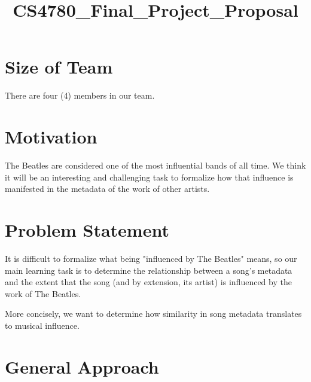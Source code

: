 \documentclass{article}
\title{CS4780_Final_Project_Proposal}
\begin{document}
 


\section{Size of Team}
There are four (4) members in our team. 

\section{Motivation}
The Beatles are considered one of the most influential bands of all time. We think it will be an interesting and challenging task to formalize how that influence is manifested in the metadata of the work of other artists. 
\section{Problem Statement}
It is difficult to formalize what being "influenced by The Beatles" means, so our main learning task is to determine the relationship between a song's metadata and the extent that the song (and by extension, its artist) is influenced by the work of The Beatles.\par
More concisely, we want to determine how similarity in song metadata translates to musical influence.\par

\section{General Approach}
\end{document}
